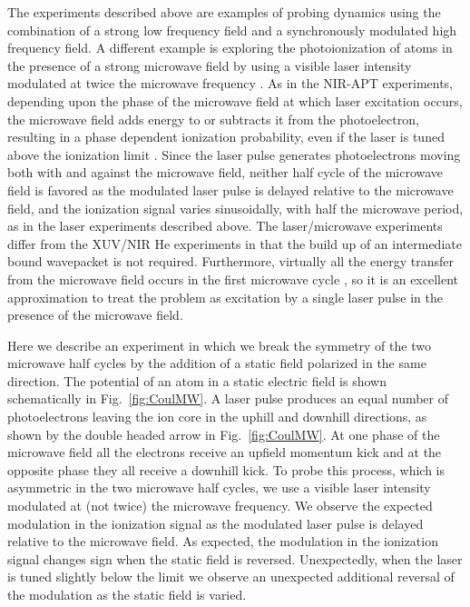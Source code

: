 \documentclass[aps,pra,reprint,groupedaddress]{revtex4-1}
\begin{document}
The experiments described above are examples of probing dynamics using the combination of a strong low frequency field and a synchronously modulated high frequency field. A different example is exploring the photoionization of atoms in the presence of a strong microwave field by using a visible laser intensity modulated at twice the microwave frequency \cite{Carrat}. As in the NIR-APT experiments, depending upon the phase of the microwave field at which laser excitation occurs, the microwave field adds energy to or subtracts it from the photoelectron, resulting in a phase dependent ionization probability, even if the laser is tuned above the ionization limit \cite{Shuman}. Since the laser pulse generates photoelectrons moving both with and against the microwave field, neither half cycle of the microwave field is favored as the modulated laser pulse is delayed relative to the microwave field, and the ionization signal varies sinusoidally, with half the microwave period, as in the laser experiments described above. The laser/microwave experiments differ from the XUV/NIR He experiments in that the build up of an intermediate bound wavepacket is not required. Furthermore, virtually all the energy transfer from the microwave field occurs in the first microwave cycle \cite{Shuman}, so it is an excellent approximation to treat the problem as excitation by a single laser pulse in the presence of the microwave field.

Here we describe an experiment in which we break the symmetry of the two microwave half cycles by the addition of a static field polarized in the same direction. The potential of an atom in a static electric field is shown schematically in Fig.~\ref{fig:CoulMW}. A laser pulse produces an equal number of photoelectrons leaving the ion core in the uphill and downhill directions, as shown by the double headed arrow in Fig.~\ref{fig:CoulMW}. At one phase of the microwave field all the electrons receive an upfield momentum kick and at the opposite phase they all receive a downhill kick. To probe this process, which is asymmetric in the two microwave half cycles, we use a visible laser intensity modulated at (not twice) the microwave frequency. We observe the expected modulation in the ionization signal as the modulated laser pulse is delayed relative to the microwave field. As expected, the modulation in the ionization signal changes sign when the static field is reversed. Unexpectedly, when the laser is tuned slightly below the limit we observe an unexpected additional reversal of the modulation as the static field is varied.
\end{document}
